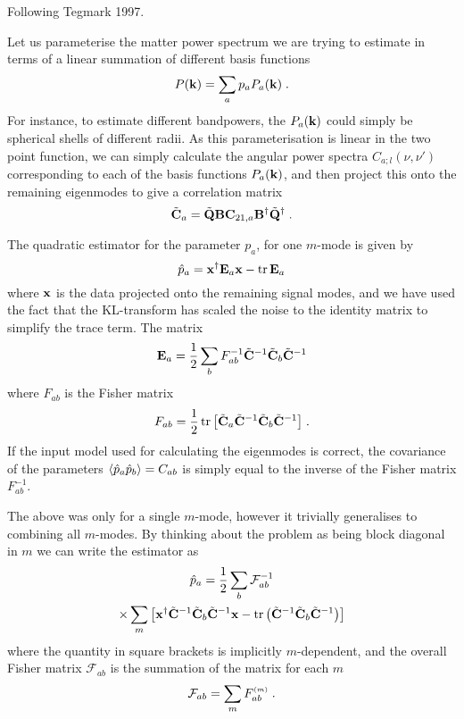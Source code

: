 \documentclass[prd,twocolumn,nofootinbib]{revtex4}
\begin{document}
Following Tegmark 1997.

Let us parameterise the matter power spectrum we are trying to estimate in terms
of a linear summation of different basis functions
\begin{equation}
P(\mathbf{k}) = \sum_a p_a P_a(\mathbf{k}) \; .
\end{equation}
For instance, to estimate different bandpowers, the $P_a(\mathbf{k})$ could simply be
spherical shells of different radii. As this parameterisation is linear in the
two point function, we can simply calculate the angular power spectra $C_{a;
  l}(\nu, \nu')$ corresponding to each of the basis functions $P_a(\mathbf{k})$, and
then project this onto the remaining eigenmodes to give a correlation matrix
\begin{equation}
\tilde{\mathbf{C}}_{a} = \tilde{\mathbf{Q}} \mathbf{B} \mathbf{C}_{21,a} \mathbf{B}^{\dagger} \tilde{\mathbf{Q}}^{\dagger} \; .
\end{equation}

The quadratic estimator for the parameter $p_a$, for one $m$-mode is given by 
\begin{equation}
\hat{p}_a = \mathbf{x}^{\dagger} \mathbf{E}_a \mathbf{x} - \operatorname{tr}{\mathbf{E}_a}
\end{equation}
where $\mathbf{x}$ is the data projected onto the remaining signal modes, and we have
used the fact that the KL-transform has scaled the noise to the identity matrix
to simplify the trace term. The matrix
\begin{equation}
\mathbf{E}_a = \frac{1}{2} \sum_b F_{ab}^{-1} \tilde{\mathbf{C}}^{-1} \tilde{\mathbf{C}}_b \tilde{\mathbf{C}}^{-1}
\end{equation}
where $F_{ab}$ is the Fisher matrix
\begin{equation}
F_{ab} = \frac{1}{2} \operatorname{tr}{\left[ \tilde{\mathbf{C}}_a \tilde{\mathbf{C}}^{-1} \tilde{\mathbf{C}}_b \tilde{\mathbf{C}}^{-1} \right]} \; .
\end{equation}
If the input model used for calculating the eigenmodes is correct, the
covariance of the parameters $\left\langle \hat{p}_a \hat{p}_b \right\rangle = C_{ab}$ is simply
equal to the inverse of the Fisher matrix $F_{ab}^{-1}$.

The above was only for a single $m$-mode, however it trivially generalises to
combining all $m$-modes. By thinking about the problem as being block diagonal
in $m$ we can write the estimator as
\begin{multline}
\hat{p}_a = \frac{1}{2} \sum_b \mathcal{F}_{ab}^{-1}\\ \times \sum_m \left[ \mathbf{x}^{\dagger} \tilde{\mathbf{C}}^{-1}
\tilde{\mathbf{C}}_b \tilde{\mathbf{C}}^{-1} \mathbf{x} - \operatorname{tr}{\left(\tilde{\mathbf{C}}^{-1} \tilde{\mathbf{C}}_b \tilde{\mathbf{C}}^{-1}\right)} \right]
\end{multline}
where the quantity in square brackets is implicitly $m$-dependent, and the
overall Fisher matrix $\mathcal{F}_{ab}$ is the summation of the matrix for each
$m$
\begin{equation}
\mathcal{F}_{ab} = \sum_m F_{ab}^{\scriptscriptstyle \left(m\right)} \; .
\end{equation}
\end{document}
